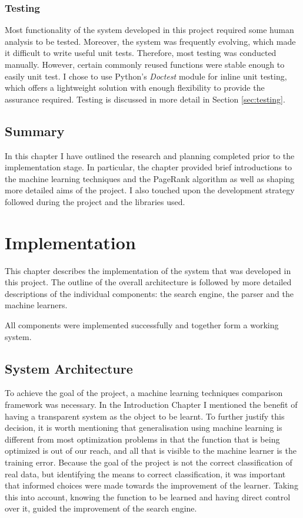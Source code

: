 \documentclass[12pt,a4paper,notitlepage,twoside]{scrbook}
\begin{document}
\subsection{Testing}
Most functionality of the system developed in this project required some human analysis to
be tested. Moreover, the system was frequently evolving, which made it difficult to write
useful unit tests. Therefore, most testing was conducted manually. However, certain
commonly reused functions were stable enough to easily unit test. I chose to use Python's
\textit{Doctest} module for inline unit testing, which offers a lightweight solution
with enough flexibility to provide the assurance required. Testing is discussed in more
detail in Section \ref{sec:testing}.
\section{Summary}
In this chapter I have outlined the research and planning completed prior to the
implementation stage. In particular, the chapter provided brief introductions to the machine
learning techniques and the PageRank algorithm as well as shaping more detailed aims of
the project. I also touched upon the development strategy followed during the project 
and the libraries used.


\chapter{Implementation}
This chapter describes the implementation of the system that was developed in this
project. The outline of the overall architecture is followed by more detailed descriptions
of the individual components: the search engine, the parser and the machine learners.

All components were implemented successfully and together form a working system.
\section{System Architecture}

To achieve the goal of the project, a machine learning techniques comparison framework was
necessary. In the Introduction Chapter I mentioned the benefit of having a transparent
system as the object to be learnt. To further justify this decision, it is worth mentioning
that generalisation using machine learning is different from most optimization problems in
that the function that is being optimized is out of our reach, and all that is visible to
the machine learner is the training error. Because the goal of the project is not the
correct classification of real data, but identifying the means to correct classification,
it was important that informed choices were made towards the improvement of the learner.
Taking this into account, knowing the function to be learned and having direct control
over it, guided the improvement of the search engine. 
\end{document}
